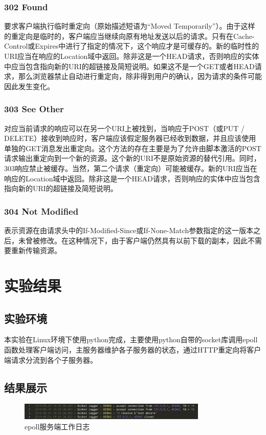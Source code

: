 \documentclass{article}
\begin{document}
\subsubsection{302 Found}
要求客户端执行临时重定向（原始描述短语为“Moved Temporarily”）。由于这样的重定向是临时的，客户端应当继续向原有地址发送以后的请求。只有在Cache-Control或Expires中进行了指定的情况下，这个响应才是可缓存的。新的临时性的URI应当在响应的Location域中返回。除非这是一个HEAD请求，否则响应的实体中应当包含指向新的URI的超链接及简短说明。如果这不是一个GET或者HEAD请求，那么浏览器禁止自动进行重定向，除非得到用户的确认，因为请求的条件可能因此发生变化。

\subsubsection{303 See Other}
对应当前请求的响应可以在另一个URI上被找到，当响应于POST（或PUT / DELETE）接收到响应时，客户端应该假定服务器已经收到数据，并且应该使用单独的GET消息发出重定向。这个方法的存在主要是为了允许由脚本激活的POST请求输出重定向到一个新的资源。这个新的URI不是原始资源的替代引用。同时，303响应禁止被缓存。当然，第二个请求（重定向）可能被缓存。新的URI应当在响应的Location域中返回。除非这是一个HEAD请求，否则响应的实体中应当包含指向新的URI的超链接及简短说明。

\subsubsection{304 Not Modified}
表示资源在由请求头中的If-Modified-Since或If-None-Match参数指定的这一版本之后，未曾被修改。在这种情况下，由于客户端仍然具有以前下载的副本，因此不需要重新传输资源。

\section{实验结果}
\subsection{实验环境}
本实验在Linux环境下使用python完成，主要使用python自带的socket库调用epoll函数处理客户端访问，主服务器维护各子服务器的状态，通过HTTP重定向将客户端请求分流到各个子服务器。

\subsection{结果展示}
\begin{figure}[ht]
    \centering
    \includegraphics[width=0.8\textwidth]{img/epoll-log.png}
    \caption{epoll服务端工作日志}
    \label{epoll}
\end{figure}
\end{document}
